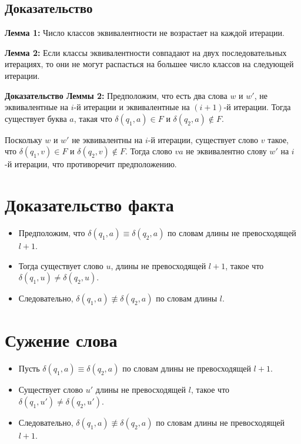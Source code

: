 \documentclass{article}
\begin{document}
\subsection{Доказательство}
\textbf{Лемма 1:} Число классов эквивалентности не возрастает на каждой итерации.

\textbf{Лемма 2:} Если классы эквивалентности совпадают на двух последовательных итерациях, то они не могут распасться на большее число классов на следующей итерации.

\textbf{Доказательство Леммы 2:}
Предположим, что есть два слова $w$ и $w'$, не эквивалентные на $i$-й итерации и эквивалентные на $(i+1)$-й итерации. Тогда существует буква $a$, такая что $\delta(q_1, a) \in F$ и $\delta(q_2, a) \notin F$.

Поскольку $w$ и $w'$ не эквивалентны на $i$-й итерации, существует слово $v$ такое, что $\delta(q_1, v) \in F$ и $\delta(q_2, v) \notin F$. Тогда слово $va$ не эквивалентно слову $w'$ на $i$-й итерации, что противоречит предположению.
\section{Доказательство факта}

\begin{itemize}
\item Предположим, что $\delta(q_1,a) \equiv \delta(q_2,a)$ по словам длины не превосходящей $l+1$.
\item Тогда существует слово $u$, длины не превосходящей $l+1$, такое что $\delta(q_1,u) \neq \delta(q_2,u)$.
\item Следовательно, $\delta(q_1,a) \not\equiv \delta(q_2,a)$ по словам длины $l$.
\end{itemize}

\section{Сужение слова}

\begin{itemize}
\item Пусть $\delta(q_1,a) \equiv \delta(q_2,a)$ по словам длины не превосходящей $l+1$.
\item Существует слово $u'$ длины не превосходящей $l$, такое что $\delta(q_1,u') \neq \delta(q_2,u')$.
\item Следовательно, $\delta(q_1,a) \not\equiv \delta(q_2,a)$ по словам длины не превосходящей $l+1$.
\end{itemize}
\end{document}

